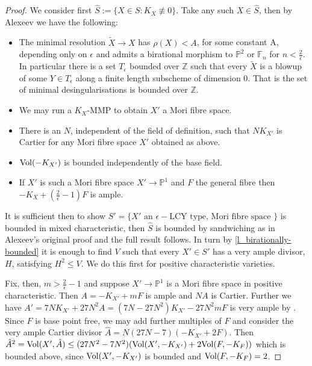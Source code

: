 	\begin{proof}
		We consider first $\hat{S}:=\{X \in S\colon  K_{X} \not\equiv 0\}$. Take any such $X \in \hat{S}$, then by Alexeev \cite[Chapter 6]{alexeev1994boundedness} we have the following:
		\begin{itemize}
			\item The minimal resolution $\tilde{X}\to X$ has $\rho(X) < A $, for some constant A, depending only on $\epsilon$ and admits a birational morphism to $\mathbb{P}^{2}$ or $\mathbb{F}_{n}$ for $n < \frac{2}{\epsilon}$. In particular there is a set $T_{\epsilon}$ bounded over $\mathbb{Z}$ such that every $\tilde{X}$ is a blowup of some $Y \in T_{\epsilon}$ along a finite length subscheme of dimension $0$. That is the set of minimal desingularisations is bounded over $\mathbb{Z}$.
			\item We may run a $K_{X}$-MMP to obtain $X'$ a Mori fibre space. 
			\item There is an $N$, independent of the field of definition, such that $NK_{X'}$ is Cartier for any Mori fibre space $X'$ obtained as above.
			\item $\text{Vol}(-K_{X'})$ is bounded independently of the base field.
			\item If $X'$ is such a Mori fibre space $X' \to \mathbb{P}^{1}$ and $F$ the general fibre then $-K_{X} +(\frac{2}{\epsilon}-1)F$ is ample.
		\end{itemize}
		
		It is sufficient then to show $S'=\{X' \text{ an } \epsilon-\text{LCY type, Mori fibre space }\}$ is bounded in mixed characteristic, then $\hat{S}$ is bounded by sandwiching as in Alexeev's original proof and the full result follows. In turn by \autoref{l_birationally-bounded} it is enough to find $V$ such that every $X' \in S'$ has a very ample divisor, $H$, satisfying $H^{2}\leq V$. We do this first for positive characteristic varieties.
		
		Fix, then, $m > \frac{2}{\epsilon}-1$ and suppose $X'\to \mathbb{P}^{1}$ is a Mori fibre space in positive characteristic. Then $A=-K_{X'} +mF$ is ample and $NA$ is Cartier. Further we have $A'=7NK_{X'}+27N^{2}A=(7N-27N^{2})K_{X'}-27N^{2}mF$ is very ample by \cite[Theorem 4.1]{witaszek2015effective}. Since $F$ is base point free, we may add further multiples of $F$ and consider the very ample Cartier divisor $\hat{A}=N(27N-7)(-K_{X'}+2F)$. Then $\hat{A}^{2}=\text{Vol}(X',\hat{A})\leq (27N^{2}-7N^{2})(\text{Vol}(X',-K_{X'})+2\text{Vol}(F,-K_{F}))$ which is bounded above, since $\text{Vol}(X',-K_{X'})$ is bounded and $\text{Vol}(F,-K_{F})=2$. 
		

\end{proof}
